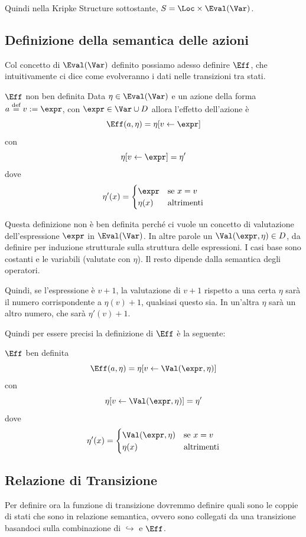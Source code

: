 Quindi nella Kripke Structure sottostante, \(S = \Loc \times \Eval(\Var)\).

\subsection{Definizione della semantica delle azioni}
Col concetto di \(\Eval(\Var)\) definito possiamo adesso definire \(\Eff\), che intuitivamente ci dice come evolveranno i dati nelle transizioni tra stati.

\begin{definition}{\(\Eff\) non ben definita}
  Data \(\eta \in \Eval(\Var)\) e un azione della forma \(a \overset{\text{def}}{=} v := \expr\), con \(\expr \in \Var \cup D\) allora l'effetto dell'azione è
  \[\Eff(a,\eta)=\eta[v\leftarrow \expr]\] con
  \[\eta[v\leftarrow \expr] = \eta'\]
  dove
  \[\eta' (x)= \begin{cases}
      \expr   & \text{se } x = v  \\
      \eta(x) & \text{altrimenti}
    \end{cases}\]
\end{definition}


Questa definizione non è ben definita perché ci vuole un concetto di valutazione dell'espressione \(\expr\) in \(\Eval(\Var)\). In altre parole un \(\Val(\expr, \eta) \in D\), da definire per induzione strutturale sulla struttura delle espressioni.
I casi base sono costanti e le variabili (valutate con \(\eta\)). Il resto dipende dalla semantica degli operatori.

Quindi, se l'espressione è \(v + 1\), la valutazione di \(v + 1\) rispetto a una certa \(\eta\) sarà il numero corrispondente a \(\eta(v) + 1\), qualsiasi questo sia. In un'altra \(\eta\) sarà un altro numero, che sarà \(\eta'(v) + 1\).

Quindi per essere precisi la definizione di \(\Eff\) è la seguente:
\begin{definition}{\(\Eff\) ben definita}
  \[\Eff(a,\eta)=\eta[v\leftarrow \Val(\expr, \eta)]\]
  con
  \[\eta[v\leftarrow \Val(\expr,\eta)] = \eta'\]
  dove
  \[\eta' (x)= \begin{cases}
      \Val(\expr,\eta) & \text{se } x = v  \\
      \eta(x)          & \text{altrimenti}
    \end{cases}\]
\end{definition}


\subsection{Relazione di Transizione}
Per definire ora la funzione di transizione dovremmo definire quali sono le coppie di stati che sono in relazione semantica, ovvero sono collegati da una transizione basandoci sulla combinazione di \(\hookrightarrow\) e \(\Eff\).

